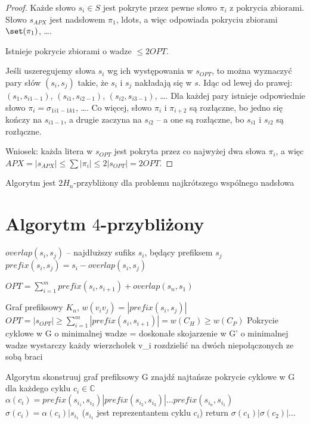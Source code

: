 \begin{proof}
	Każde słowo $s_i \in S$ jest pokryte przez pewne słowo $\pi_i$ z pokrycia zbiorami. Słowo $s_{APX}$ jest nadsłowem $\pi_1$, ldots, a więc odpowiada pokryciu zbiorami $\set(\pi_1)$, \ldots. 
	
	Istnieje pokrycie zbiorami o wadze $\le 2 OPT$.
	
	Jeśli uszeregujemy słowa $s_i$ wg ich występowania w $s_{OPT}$, to można wyznaczyć pary słów $(s_i, s_j)$ takie, że $s_i$ i $s_j$ nakładają się w $s$. Idąc od lewej do prawej: $(s_1, s_{i1 - 1})$, $(s_{i1}, s_{i2 - 1})$, $(s_{i2}, s_{i3 - 1})$, \ldots. Dla każdej pary istnieje odpowiednie słowo $\pi_i = \sigma_{1 {i1 - 1} k1}$, \ldots. Co więcej, słowo $\pi_i$ i $\pi_{i + 2}$ są rozłączne, bo jedno się kończy na $s_{i1 - 1}$, a drugie zaczyna na $s_{i2}$ -- a one są rozłączne, bo $s_{i1}$ i $s_{i2}$ są rozłączne.
	
	Wniosek: każda litera w $s_{OPT}$ jest pokryta przez co najwyżej dwa słowa $\pi_i$, a więc $APX = |s_{APX}| \le \sum |\pi_i| \le 2 |s_{OPT}| = 2 OPT$. 
\end{proof}

\begin{corollary}
	Algorytm jest $2 H_n$-przybliżony dla problemu najkrótszego wspólnego nadsłowa
\end{corollary}

\section{Algorytm $4$-przybliżony}

$overlap(s_i, s_j)$ -- najdłuższy sufiks $s_i$, będący prefiksem $s_j$
$prefix(s_i, s_j) = s_i - overlap(s_i, s_j)$

$OPT = \sum_{i = 1}^{m} prefix(s_i, s_{i + 1}) + overlap(s_n, s_1)$

Graf prefiksowy $K_n$, $w(v_iv_j) = |prefix(s_i, s_j)|$
	$OPT = |s_{OPT}| \ge \sum_{i = 1}^{m} |prefix(s_i, s_{i + 1})| = w(C_H) \ge w(C_P)$
Pokrycie cyklowe w G o minimalnej wadze = doskonałe skojarzenie w G' o minimalnej wadze
	wystarczy każdy wierzchołek v_i rozdzielić na dwóch niepołączonych ze sobą braci

Algorytm
	skonstruuj graf prefiksowy G
	znajdź najtańsze pokrycie cyklowe  w G
	dla każdego cyklu $c_i \in \mathbb{C}$
		$\alpha(c_i) = prefix(s_i_1, s_i_2) | prefix(s_i_2, s_i_3) | \ldots prefix(s_i_n, s_i_1)$
		$\sigma(c_i) = \alpha(c_i) | s_i_1$ ($s_i_1$ jest reprezentantem cyklu $c_i$)
	return $\sigma(c_1) | \sigma(c_2) | \ldots$
	
